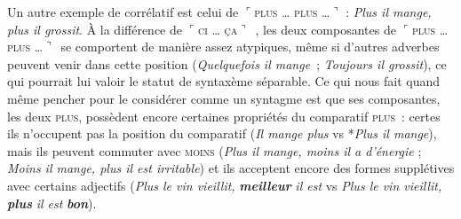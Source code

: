 {    Un autre exemple de corrélatif est celui de \textrm{$⌜$}\textsc{plus} \textsc{…} \textsc{plus} \textsc{…}\textrm{$⌝$} : \textit{Plus il mange, plus il grossit}. À la différence de \textrm{$⌜$}\textsc{ci} \textsc{…} \textsc{ça}\textrm{$⌝$}~, les deux composantes de \textrm{$⌜$}\textsc{plus} \textsc{…} \textsc{plus} \textsc{…}\textrm{$⌝$}~se comportent de manière assez atypiques, même si d’autres adverbes peuvent venir dans cette position (\textit{Quelquefois il mange~}; \textit{Toujours il grossit}), ce qui pourrait lui valoir le statut de syntaxème séparable. Ce qui nous fait quand même pencher pour le considérer comme un syntagme est que ses composantes, les deux \textsc{plus}, possèdent encore certaines propriétés du comparatif \textsc{plus~}: certes ils n’occupent pas la position du comparatif (\textit{Il mange plus} vs *\textit{Plus il mange}), mais ils peuvent commuter avec \textsc{moins} (\textit{Plus il mange, moins il a d’énergie} ; \textit{Moins il mange, plus il est irritable}) et ils acceptent encore des formes supplétives avec certains adjectifs (\textit{Plus le vin vieillit,} \textbf{\textit{meilleur}} \textit{il est} vs \textit{Plus le vin vieillit,} \textbf{\textit{plus}} \textit{il est} \textbf{\textit{bon}}).
}
